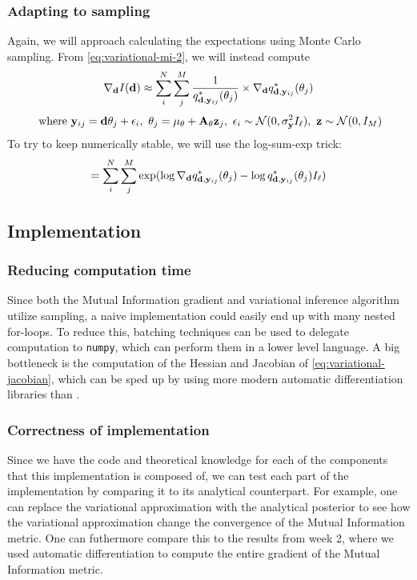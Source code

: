 \subsubsection{Adapting to sampling}
Again, we will approach calculating the expectations using Monte Carlo sampling. From \eqref{eq:variational-mi-2}, we will instead compute
\begin{equation}\nabla_{\mathbf{d}} I(\mathbf{d}) \approx \sum_{i}^N \sum_{j}^M \frac{1}{q^*_{\mathbf{d}, \mathbf{y}_{ij}}(\theta_{j})}\times \nabla_{\mathbf{d}}q^*_{\mathbf{d}, \mathbf{y}_{ij}}(\theta_{j})\end{equation}
$$\ \textrm{where}\ \B{y}_{ij} = \B{d}\theta_j + \epsilon_i,\ \theta_j = \mu_\theta + \B{A}_\theta\B{z}_j,\ \epsilon_i \sim \mathcal{N}(0, \sigma^2_\B{y} I_\ell),\ \B{z} \sim \mathcal{N}(0, I_M)$$
To try to keep numerically stable, we will use the log-sum-exp trick:
\begin{equation}= \sum_{i}^N \sum_{j}^M \exp (\log \nabla_{\mathbf{d}}q^*_{\mathbf{d}, \mathbf{y}_{ij}}(\theta_{j})- \log q^*_{\mathbf{d}, \mathbf{y}_{ij}}(\theta_{j})I_\ell) \label{eq:sample-mi-var}\end{equation}

\subsection{Implementation}
\subsubsection{Reducing computation time}
Since both the Mutual Information gradient and variational inference algorithm utilize sampling, a naive implementation could easily end up with many nested for-loops.
To reduce this, batching techniques can be used to delegate computation to \texttt{numpy}, which can perform them in a lower level language. 
A big bottleneck is the computation of the Hessian and Jacobian of \eqref{eq:variational-jacobian}, which can be sped up by using more modern automatic differentiation libraries than .
\subsubsection{Correctness of implementation}
Since we have the code and theoretical knowledge for each of the components that this implementation is composed of, 
we can test each part of the implementation by comparing it to its analytical counterpart. 
For example, one can replace the variational approximation with the analytical posterior to see how the variational approximation change the convergence of the Mutual Information metric.
One can futhermore compare this to the results from week 2, where we used automatic differentiation to compute the entire gradient of the Mutual Information metric.
